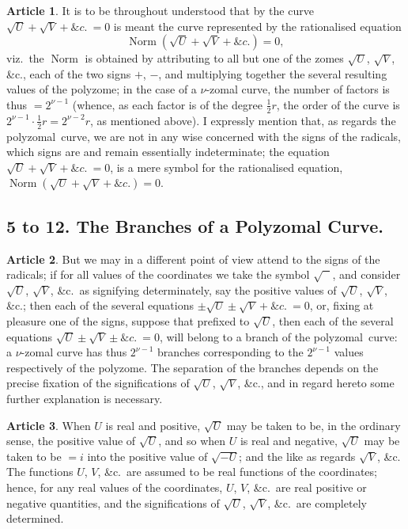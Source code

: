 \documentclass[11pt,a4paper]{article}
\theoremstyle{definition}
\newtheorem{art}{Article}
\newcommand{\polyzomal}{polyzomal}
\newcommand{\polyzome}{polyzome}
\DeclareMathOperator{\Norm}{Norm}
\newcommand{\norm}{\Norm}
\begin{document}
\begin{art}
It is to be throughout understood that by the curve $\sqrt{U} + \sqrt{V} + \&c.\ = 0$ is meant the curve represented by the rationalised equation
\[
\norm(\sqrt{U} + \sqrt{V} + \&c.) = 0,
\]
viz.\ the $\norm$ is obtained by attributing to all but one of the zomes $\sqrt{U}$, $\sqrt{V}$, \&c., each of the two signs $+$, $-$, and multiplying together the several resulting values of the \polyzome; in the case of a $\nu$-zomal curve, the number of factors is thus $= 2^{\nu-1}$ (whence, as each factor is of the degree $\tfrac{1}{2}r$, the order of the curve is $2^{\nu-1} \cdot \tfrac{1}{2}r = 2^{\nu-2}r$, as mentioned above). I expressly mention that, as regards the \polyzomal\ curve, we are not in any wise concerned with the signs of the radicals, which signs are and remain essentially indeterminate; the equation $\sqrt{U} + \sqrt{V} + \&c.\ = 0$, is a mere symbol for the rationalised equation, $\norm(\sqrt{U} + \sqrt{V} + \&c.) = 0$.
\end{art}

\subsection{5 to 12. The Branches of a Polyzomal Curve.}

\begin{art}
But we may in a different point of view attend to the signs of the radicals; if for all values of the coordinates we take the symbol $\sqrt{\phantom{U}}$, and consider $\sqrt{U}$, $\sqrt{V}$, \&c.\ as signifying determinately, say the positive values of $\sqrt{U}$, $\sqrt{V}$, \&c.; then each of the several equations $\pm\sqrt{U} \pm \sqrt{V} + \&c.\ = 0$, or, fixing at pleasure one of the signs, suppose that prefixed to $\sqrt{U}$, then each of the several equations $\sqrt{U} \pm \sqrt{V} \pm \&c.\ = 0$, will belong to a branch of the \polyzomal\ curve: a $\nu$-zomal curve has thus $2^{\nu-1}$ branches corresponding to the $2^{\nu-1}$ values respectively of the \polyzome. The separation of the branches depends on the precise fixation of the significations of $\sqrt{U}$, $\sqrt{V}$, \&c., and in regard hereto some further explanation is necessary.
\end{art}

\begin{art}
When $U$ is real and positive, $\sqrt{U}$ may be taken to be, in the ordinary sense, the positive value of $\sqrt{U}$, and so when $U$ is real and negative, $\sqrt{U}$ may be taken to be $= i$ into the positive value of $\sqrt{-U}$; and the like as regards $\sqrt{V}$, \&c. The functions $U$, $V$, \&c.\ are assumed to be real functions of the coordinates; hence, for any real values of the coordinates, $U$, $V$, \&c.\ are real positive or negative quantities, and the significations of $\sqrt{U}$, $\sqrt{V}$, \&c.\ are completely determined.
\end{art}
\end{document}
